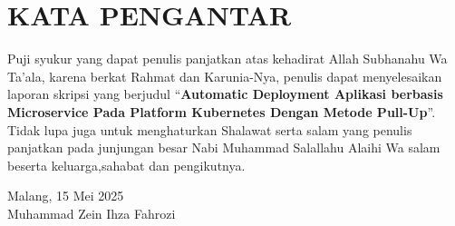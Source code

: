 \chapter*{\uppercase{KATA PENGANTAR}}

Puji syukur yang dapat penulis panjatkan atas kehadirat Allah Subhanahu Wa
Ta’ala, karena berkat Rahmat dan Karunia-Nya, penulis dapat menyelesaikan
laporan skripsi yang berjudul “\textbf{Automatic Deployment Aplikasi berbasis Microservice Pada
    Platform Kubernetes Dengan Metode Pull-Up}”. Tidak lupa juga untuk menghaturkan
Shalawat serta salam yang penulis panjatkan pada junjungan besar Nabi
Muhammad Salallahu Alaihi Wa salam beserta keluarga,sahabat dan pengikutnya.


\begin{flushright}
    Malang, 15 Mei 2025 \\[3cm] %
    Muhammad Zein Ihza Fahrozi
\end{flushright}


\newpage
